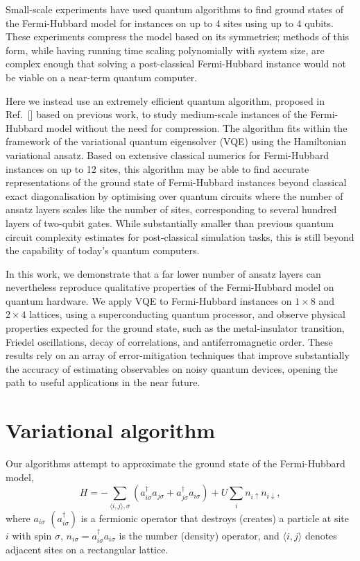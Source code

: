 \documentclass[aps,prb,twoside,superscriptaddress,longbibliography,nofootinbib,floatfix, notitlepage,twocolumn]{revtex4-1}
\newcommand{\be}{\begin{equation}}
\newcommand{\ee}{\end{equation}}
\begin{document}
Small-scale experiments have used quantum algorithms to find ground states of the Fermi-Hubbard model for instances on up to 4 sites\cite{linke18,montanaro20,suchsland21} using up to 4 qubits.
These experiments compress the model based on its symmetries; methods of this form, while having running time scaling polynomially with system size, are complex enough that solving a post-classical Fermi-Hubbard instance would not be viable on a near-term quantum computer.

Here we instead use an extremely efficient quantum algorithm, proposed in Ref.~[] based on previous work\cite{wecker15,jiang2018quantum,kivlichan18}, to study medium-scale instances of the Fermi-Hubbard model without the need for compression. The algorithm fits within the framework of the variational quantum eigensolver\cite{peruzzo14,bharti2021noisy} (VQE) using the Hamiltonian variational ansatz\cite{wecker15}. Based on extensive classical numerics for Fermi-Hubbard instances on up to 12 sites\cite{cade20}, this algorithm may be able to find accurate representations of the ground state of Fermi-Hubbard instances beyond classical exact diagonalisation by optimising over quantum circuits where the number of ansatz layers scales like the number of sites, corresponding to several hundred layers of two-qubit gates. While substantially smaller than previous quantum circuit complexity estimates for post-classical simulation tasks, this is still beyond the capability of today's quantum computers.

In this work, we demonstrate that a far lower number of ansatz layers can nevertheless reproduce qualitative properties of the Fermi-Hubbard model on quantum hardware. We apply VQE to Fermi-Hubbard instances on $1\times 8$ and $2\times 4$ lattices, using a superconducting quantum processor\cite{sycamore}, and observe physical properties expected for the ground state, such as the metal-insulator transition, Friedel oscillations, decay of correlations, and antiferromagnetic order. These results rely on an array of error-mitigation techniques that improve substantially the accuracy of estimating observables on noisy quantum devices, opening the path to useful applications in the near future.



\section{Variational algorithm}

Our algorithms attempt to approximate the ground state of the Fermi-Hubbard model,
%
\be \label{eq:hubbard} H = -\sum_{\langle i, j \rangle,\sigma} (a_{i\sigma}^\dag a_{j\sigma} + a_{j\sigma}^\dag a_{i\sigma}) + U \sum_i n_{i\uparrow}n_{i\downarrow}, \ee
%
where $a_{i\sigma}$ $(a^\dagger_{i\sigma})$ is a fermionic operator that destroys (creates) a particle at site $i$ with spin $\sigma$, $n_{i\sigma}=a^\dagger_{i\sigma}a_{i\sigma}$ is the number (density) operator, and $\langle i, j \rangle$ denotes adjacent sites on a rectangular lattice.
\end{document}
